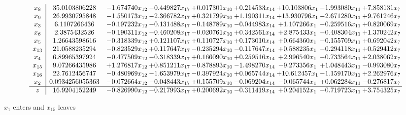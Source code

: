 \documentclass[10pt]{article}
\begin{document}
 \[\begin{array}{c| c c@{\hskip 2pt} c@{\hskip 2pt} c@{\hskip 2pt} c@{\hskip 2pt} c@{\hskip 2pt} c@{\hskip 2pt} c@{\hskip 2pt} }
 x_{8}   &  35.0103806228 & -1.674740 x_{12} & -0.449827 x_{17} & + 0.017301 x_{10} & + 0.214533 x_{14} & + 10.103806 x_{1} & -1.993080 x_{11} & + 7.858131 x_{7}\\
 x_{9}   &  26.9930795848 & -1.550173 x_{12} & -2.366782 x_{17} & + 0.321799 x_{10} & + 1.190311 x_{14} & + 13.930796 x_{1} & -2.671280 x_{11} & + 9.761246 x_{7}\\
 x_{3}   &  6.1107266436 & -0.197232 x_{12} & -0.131488 x_{17} & -0.148789 x_{10} & -0.044983 x_{14} & + 1.107266 x_{1} & -0.259516 x_{11} & + 0.820069 x_{7}\\
 x_{6}   &  2.3875432526 & -0.190311 x_{12} & -0.460208 x_{17} & -0.020761 x_{10} & + 0.342561 x_{14} & + 2.875433 x_{1} & -0.408304 x_{11} & + 1.370242 x_{7}\\
 x_{5}   &  1.26643598616 & -0.318339 x_{12} & + 0.121107 x_{17} & + 0.110727 x_{10} & + 0.173010 x_{14} & + 0.664360 x_{1} & -0.155709 x_{11} & + 0.692042 x_{7}\\
 x_{13}   &  21.0588235294 & -0.823529 x_{12} & + 0.117647 x_{17} & -0.235294 x_{10} & -0.117647 x_{14} & + 0.588235 x_{1} & -0.294118 x_{11} & + 0.529412 x_{7}\\
 x_{4}   &  6.89965397924 & -0.477509 x_{12} & -0.318339 x_{17} & + 0.166090 x_{10} & + 0.259516 x_{14} & + 2.996540 x_{1} & -0.733564 x_{11} & + 2.038062 x_{7}\\
 x_{15}   &  9.07266435986 & + 1.276817 x_{12} & + 0.851211 x_{17} & -0.878893 x_{10} & -1.498270 x_{14} & -9.273356 x_{1} & + 1.048443 x_{11} & -0.993080 x_{7}\\
 x_{16}   &  22.7612456747 & -0.480969 x_{12} & -1.653979 x_{17} & -0.397924 x_{10} & + 0.065744 x_{14} & + 10.612457 x_{1} & -1.159170 x_{11} & + 2.262976 x_{7}\\
 x_{2}   &  0.0934256055363 & -0.072664 x_{12} & -0.048443 x_{17} & + 0.155709 x_{10} & -0.069204 x_{14} & -0.065744 x_{1} & + 0.062284 x_{11} & -0.276817 x_{7}\\
\hline
z    &  16.9204152249 & -0.826990 x_{12} & -0.217993 x_{17} & + 0.200692 x_{10} & -0.311419 x_{14} & + 0.204152 x_{1} & -0.719723 x_{11} & + 3.754325 x_{7}\\
\end{array}\]


 $ x_{1} $ enters and $ x_{15} $ leaves 
\end{document}
